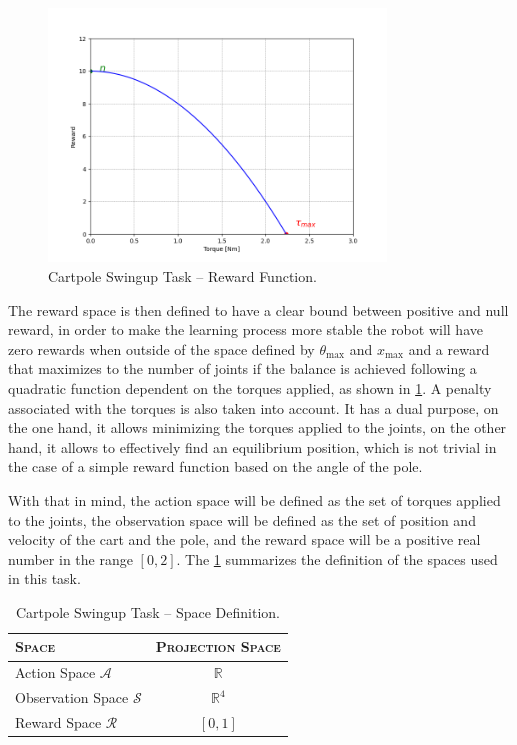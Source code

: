 \begin{figure}
    \centering
    \includegraphics[width=0.8\textwidth]{Images/cartpole_reward.png}
    \caption{Cartpole Swingup Task -- Reward Function.}
    \label{fig:cartpolereward}
\end{figure}

The reward space is then defined to have a clear bound between positive and null reward, in order to make the learning process more stable the robot will have zero rewards when outside of the space defined by $\theta_{\text{max}}$ and $x _{\text{max}}$ and a reward that maximizes to the number of joints if the balance is achieved following a quadratic function dependent on the torques applied, as shown in \cref{fig:cartpolereward}. A penalty associated with the torques is also taken into account. It has a dual purpose, on the one hand, it allows minimizing the torques applied to the joints, on the other hand, it allows to effectively find an equilibrium position, which is not trivial in the case of a simple reward function based on the angle of the pole.

With that in mind, the action space will be defined as the set of torques applied to the joints, the observation space will be defined as the set of position and velocity of the cart and the pole, and the reward space will be a positive real number in the range $[0,2]$. The \cref{tab:cartpoleswinguptaskspacedef} summarizes the definition of the spaces used in this task.

\begin{table}
    \centering
    \label{tab:cartpoleswinguptaskspacedef}
    \begin{tabular}{l c}
        \toprule
        \textsc{Space}                  & \textsc{Projection Space} \\
        \midrule
        Action Space $\mathcal{A}$      & $\mathbb{R}$              \\
        Observation Space $\mathcal{S}$ & $\mathbb{R} ^{4}$         \\
        Reward Space $\mathcal{R}$      & $[0,1]$                   \\
        \bottomrule
    \end{tabular}
    \caption{Cartpole Swingup Task -- Space Definition.}
\end{table}

